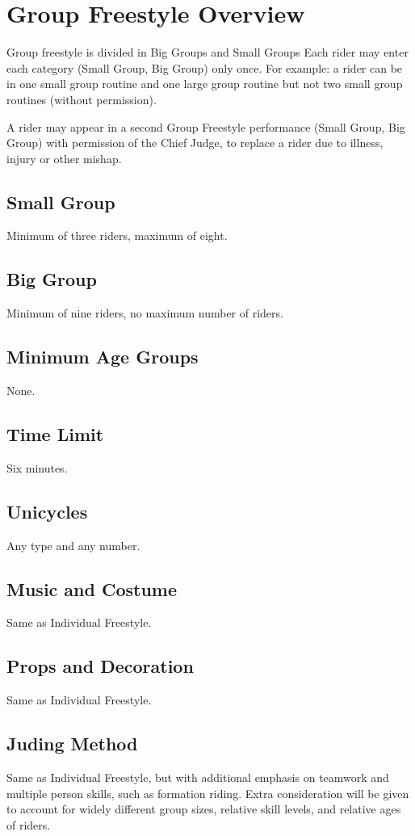 \section{Group Freestyle Overview}
Group freestyle is divided in Big Groups and Small Groups 
Each rider may enter each category (Small Group, Big Group) only once. For example: a rider can be in one small group routine and one large group routine but not two small group routines (without permission).

A rider may appear in a second Group Freestyle performance (Small Group, Big Group) with permission of the Chief Judge, to replace a rider due to illness, injury or other mishap. 

\subsection{Small Group}
Minimum of three riders, maximum of eight.

\subsection{Big Group}
Minimum of nine riders, no maximum number of riders.

\subsection{Minimum Age Groups}
None.

\subsection{Time Limit}
Six minutes.

\subsection{Unicycles}
Any type and any number.

\subsection{Music and Costume}
Same as Individual Freestyle.

\subsection{Props and Decoration}
Same as Individual Freestyle.

\subsection{Juding Method}
Same as Individual Freestyle, but with additional emphasis on teamwork and multiple person skills, such as formation riding.
Extra consideration will be given to account for widely different group sizes, relative skill levels, and relative ages of riders.

